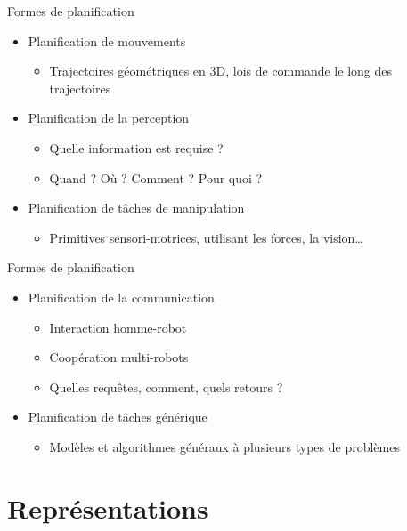 \documentclass[compress]{beamer}
\begin{document}
\begin{frame}{Formes de planification}
\begin{itemize}
\item Planification de mouvements
	\begin{itemize}
	\item Trajectoires géométriques en 3D, lois de commande le long des trajectoires
	\end{itemize}
\item Planification de la perception
	\begin{itemize}
	\item Quelle information est requise ?
	\item Quand ? Où ? Comment ? Pour quoi ?
	\end{itemize}
\item Planification de tâches de manipulation
	\begin{itemize}
	\item Primitives sensori-motrices, utilisant les forces, la vision\dots
	\end{itemize}
\end{itemize}
\end{frame}

\begin{frame}{Formes de planification}
\begin{itemize}
\item Planification de la communication
	\begin{itemize}
	\item Interaction homme-robot
	\item Coopération multi-robots
	\item Quelles requêtes, comment, quels retours ?
	\end{itemize}
\item Planification de tâches générique
	\begin{itemize}
	\item Modèles et algorithmes généraux à plusieurs types de problèmes
	\end{itemize}
\end{itemize}
\end{frame}

\section{Représentations}
\begin{frame}
\tableofcontents[hideothersubsections]
\end{frame}
\end{document}
